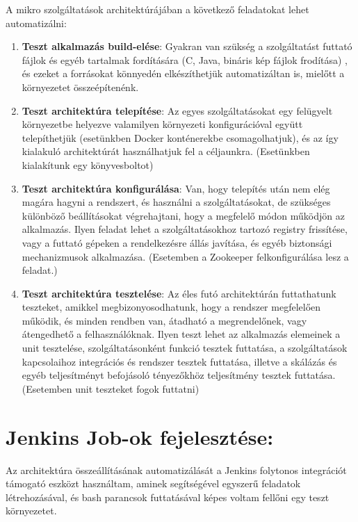 \documentclass[11pt,magyar,a4paper,oneside,]{report}
\providecommand{\tightlist}{%
  \setlength{\itemsep}{0pt}\setlength{\parskip}{0pt}}
\begin{document}
A mikro szolgáltatások architektúrájában a következő feladatokat lehet
automatizálni:

\begin{enumerate}
\def\labelenumi{\arabic{enumi}.}
\tightlist
\item
  \textbf{Teszt alkalmazás build-elése}: Gyakran van szükség a
  szolgáltatást futtató fájlok és egyéb tartalmak fordítására (C, Java,
  bináris kép fájlok frodítása) , és ezeket a forrásokat könnyedén
  elkészíthetjük automatizáltan is, mielőtt a környezetet
  összeépítenénk.
\item
  \textbf{Teszt architektúra telepítése}: Az egyes szolgáltatásokat egy
  felügyelt környezetbe helyezve valamilyen környezeti konfigurációval
  együtt telepíthetjük (esetünkben Docker konténerekbe csomagolhatjuk),
  és az így kialakuló architektúrát használhatjuk fel a céljaunkra.
  (Esetünkben kialakítunk egy könyvesboltot)
\item
  \textbf{Teszt architektúra konfigurálása}: Van, hogy telepítés után
  nem elég magára hagyni a rendszert, és használni a szolgáltatásokat,
  de szükséges különböző beállításokat végrehajtani, hogy a megfelelő
  módon működjön az alkalmazás. Ilyen feladat lehet a szolgáltatásokhoz
  tartozó registry frissítése, vagy a futtató gépeken a rendelkezésre
  állás javítása, és egyéb biztonsági mechanizmusok alkalmazása.
  (Esetemben a Zookeeper felkonfigurálása lesz a feladat.)
\item
  \textbf{Teszt architektúra tesztelése}: Az éles futó architektúrán
  futtathatunk teszteket, amikkel megbizonyosodhatunk, hogy a rendszer
  megfelelően működik, és minden rendben van, átadható a megrendelőnek,
  vagy átengedhető a felhasználóknak. Ilyen teszt lehet az alkalmazás
  elemeinek a unit tesztelése, szolgáltatásonként funkció tesztek
  futtatása, a szolgáltatások kapcsolaihoz integrációs és rendszer
  tesztek futtatása, illetve a skálázás és egyéb teljesítményt
  befojásoló tényezőkhöz teljesítmény tesztek futtatása. (Esetemben unit
  teszteket fogok futtatni)
\end{enumerate}

\section{Jenkins Job-ok
fejelesztése:}\label{jenkins-job-ok-fejelesztuxe9se}

Az architektúra összeállításának automatizálását a Jenkins folytonos
integrációt támogató eszközt használtam, aminek segítségével egyszerű
feladatok létrehozásával, és bash parancsok futtatásával képes voltam
fellőni egy teszt környezetet.
\end{document}
